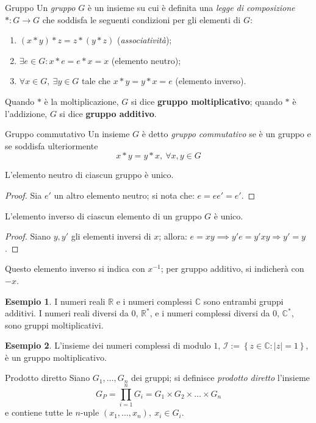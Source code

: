 \documentclass[11pt, a4paper]{scrartcl}
\theoremstyle{definition}
\newtheorem{esempio}{Esempio}
\numberwithin{esempio}{section}
\theoremstyle{definition}
\numberwithin{obs}{section}
\numberwithin{nota}{section}
\numberwithin{equation}{subsection}
\begin{document}
\begin{definizione}
	{Gruppo}{}
	Un \textit{gruppo} $G$ \`e un insieme su cui \`e definita una \textit{legge di composizione} $* : G \to G$ che soddisfa le seguenti condizioni per gli elementi di $G$:
	\begin{enumerate}[GR 1.]
		\item $(x*y) * z =  z*(y * z)$ (\textit{associativit\`a});
		\item $\exists e \in G : x*e = e*x = x$ (elemento neutro);
		\item $\forall x \in G, \ \exists y \in G$ tale che $x*y = y*x = e$ (elemento inverso).
	\end{enumerate}
\end{definizione}
\noindent Quando $*$ \`e la moltiplicazione, $G $ si dice \textbf{gruppo moltiplicativo}; quando $*$ \`e l'addizione, $G $ si dice \textbf{gruppo additivo}.
\begin{definizione}
	{Gruppo commutativo}{}
	Un insieme $G$ \`e detto \textit{gruppo commutativo} se \`e un gruppo e se soddisfa ulteriormente
	\[
	x *y = y *x, \ \forall x,y \in G
	\] 
\end{definizione}
\noindent L'elemento neutro di ciascun gruppo \`e unico.
\begin{proof}
	Sia $e' $ un altro elemento neutro; si nota che: $e = e e' = e'$.
\end{proof}
\noindent L'elemento inverso di ciascun elemento di un gruppo $G$ \`e unico.
\begin{proof}
	Siano $y,y'$ gli elementi inversi di $x$; allora: $e = x y\implies y' e = y' x y \Rightarrow y' = y$.
\end{proof}
\noindent Questo elemento inverso si indica con $x^{-1} $; per gruppo additivo, si indicher\`a con $-x$.
\begin{esempio}
I numeri reali $\mathbb{R}$ e i numeri complessi $\mathbb{C}$ sono entrambi gruppi additivi. I numeri reali diversi da $0$, $\mathbb{R}^*$, e i numeri complessi diversi da $0$, $\mathbb{C}^*$, sono gruppi moltiplicativi.
\end{esempio}
\begin{esempio}
	L'insieme dei numeri complessi di modulo $1$, $\mathscr{I}:= \left\{ z \in \mathbb{C} : |z| = 1 \right\} $, \`e un gruppo moltiplicativo.
\end{esempio}
\begin{definizione}
	{Prodotto diretto}{}
	Siano $G_1, \ldots, G_n$ dei gruppi; si definisce \textit{prodotto diretto} l'insieme
	\[
	G_P = \prod_{i=1} ^n G_i = G_1 \times G_2 \times \ldots \times G_n
	\] 
	e contiene tutte le $n$-uple $(x_1,\ldots,x_n), \ x_i \in G_i$.
\end{definizione}
\end{document}
